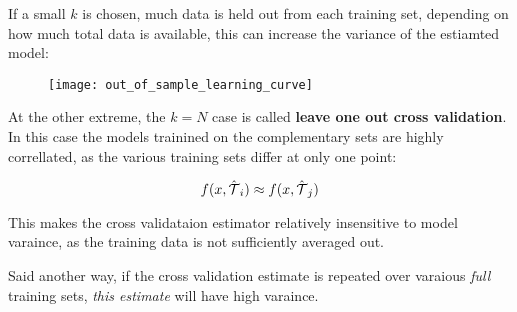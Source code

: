 %
%
\begin{frame}
  If a small $k$ is chosen, much data is held out from each training set,
  depending on how much total data is available, this can increase the variance
  of the estiamted model:
  \begin{figure}
    \texttt{[image: out\_of\_sample\_learning\_curve]}
  \end{figure}
\end{frame}
%
%
\begin{frame}
  At the other extreme, the $k = N$ case is called \textbf{leave one out cross
  validation}.  In this case the models trainined on the complementary sets are
  highly correllated, as the various training sets differ at only one point:

  $$ f(x, \hat{{\operatorname*{\mathcal{T}}}}_i) \approx  f(x, \hat{{\operatorname*{\mathcal{T}}}}_j) $$
\end{frame}
%
%
\begin{frame}
  This makes the cross validataion estimator relatively insensitive to model
  varaince, as the training data is not sufficiently averaged out.

  Said another way, if the cross validation estimate is repeated over varaious
  \textit{full} training sets, \textit{this estimate} will have high varaince.
\end{frame}
